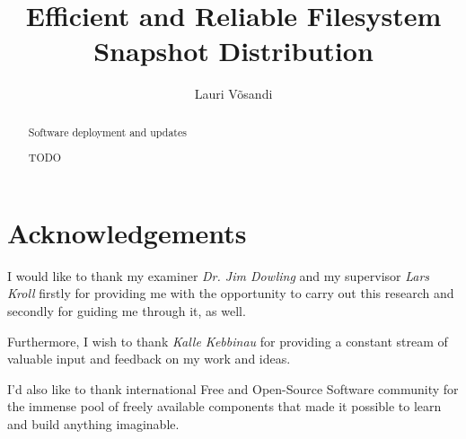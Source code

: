 \documentclass[a4paper,11pt]{kth-mag}
\title{Efficient and Reliable Filesystem Snapshot Distribution}
\subtitle{}
\author{Lauri Võsandi}
\date{}
\begin{document}


\frontmatter
\pagestyle{empty}
\removepagenumbers
\maketitle
{}

%
%
%
%
\begin{abstract}

Software deployment and updates 

TODO

\end{abstract}

\chapter*{Acknowledgements}

I would like to thank my examiner \emph{Dr. Jim Dowling} and my supervisor \emph{Lars Kroll} firstly for providing me with the opportunity to carry out this research and secondly for guiding me through it, as well. 

Furthermore, I wish to thank \emph{Kalle Kebbinau} for providing a constant
stream of valuable input and feedback on my work and ideas.

I'd also like to thank international Free and Open-Source Software community
for the immense pool of freely available components that made it possible
to learn and build anything imaginable.

\clearpage

\tableofcontents*

\mainmatter
\pagestyle{newchap}

\clearpage

%
%
%
%
\end{document}
